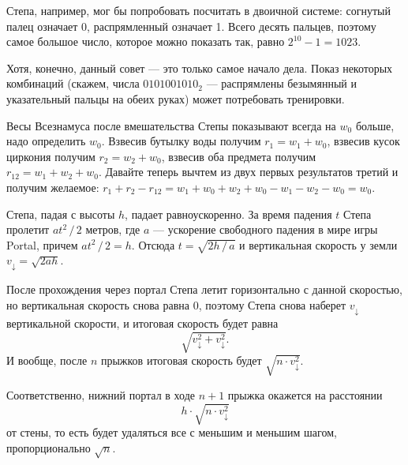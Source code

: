 ﻿
\begin{itemize}
\itA Степа, например, мог бы попробовать посчитать в двоичной системе:
согнутый палец означает 0, распрямленный означает 1. Всего десять пальцев,
поэтому самое большое число, которое можно показать так, равно $2^{10}-1 = 1023$.

Хотя, конечно, данный совет --- это только самое начало дела. Показ некоторых
комбинаций (скажем, числа $0101001010_2$ --- распрямлены безымянный и указательный
пальцы на обеих руках) может потребовать тренировки.


\itB Весы Всезнамуса после вмешательства Степы показывают всегда на $w_0$ больше, надо определить $w_0$.
Взвесив бутылку воды получим $r_1 = w_1 + w_0$, взвесив кусок циркония получим $r_2 = w_2 + w_0$,
взвесив оба предмета получим $r_{12} = w_1 + w_2 + w_0$. Давайте теперь вычтем из двух 
первых результатов третий и получим желаемое: 
$r_1 + r_2 - r_{12} = w_1 + w_0 + w_2 + w_0 - w_1 - w_2 - w_0 = w_0$.

\itC Степа, падая с высоты $h$, падает равноускоренно. За время падения $t$ Степа пролетит 
$at^2\,/\,2$ метров, где $a$ --- ускорение свободного падения в мире игры Portal, 
причем $at^2\,/\,2 = h$. Отсюда $t = \sqrt{2h\,/\,a}$ и вертикальная скорость
у земли $v_\downarrow = \sqrt{2ah}$.

После прохождения через портал Степа летит горизонтально с данной скоростью, но вертикальная
скорость снова равна 0, поэтому Степа снова наберет $v_\downarrow$ вертикальной скорости, и
итоговая скорость будет равна
	$$\sqrt{v_\downarrow^2 + v_\downarrow^2}.$$
И вообще, после $n$ прыжков итоговая скорость будет $\sqrt{n \cdot v_\downarrow^2}$.

Соответственно, нижний портал в ходе $n+1$ прыжка окажется на расстоянии 
	$$h \cdot \sqrt{n \cdot v_\downarrow^2}$$
от стены, то есть будет удаляться все с меньшим и меньшим шагом,
пропорционально $\sqrt{n}$.

\end{itemize}
